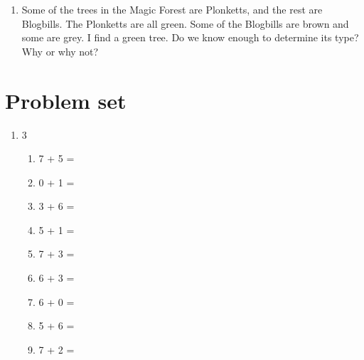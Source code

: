 \documentclass{tufte-book}
\begin{document}
\begin{enumerate}
  \item
  Some of the trees in the Magic Forest are Plonketts, and the rest are Blogbills.
  The Plonketts are all green. Some of the Blogbills are brown and some are grey.
  I find a green tree. Do we know enough to determine its type? Why or why not?\bigskip

  \dotfill\bigskip\par\dotfill

\end{enumerate}

\clearpage\section{Problem set }

\begin{enumerate}
  \item
  \begin{multicols}{3}
    \begin{enumerate}\bigskip
      \item 7 + 5 = \dotfill\bigskip
      \item 0 + 1 = \dotfill\bigskip
      \item 3 + 6 = \dotfill
      \item 5 + 1 = \dotfill\bigskip
      \item 7 + 3 = \dotfill\bigskip
      \item 6 + 3 = \dotfill
      \item 6 + 0 = \dotfill\bigskip
      \item 5 + 6 = \dotfill\bigskip
      \item 7 + 2 = \dotfill
    \end{enumerate}
  \end{multicols}


\end{enumerate}
\end{document}

